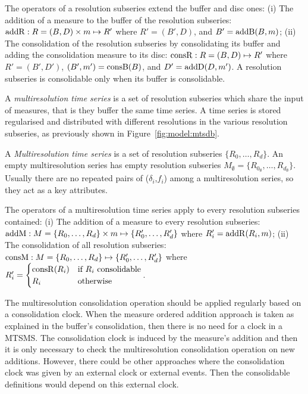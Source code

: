 The operators of a resolution subseries extend the buffer and disc
ones: (i) The addition of a measure to the buffer of the resolution
subseries: $\operatorname{addR} : R=(B,D) \times m \mapsto R'$ where $R'= (B',D)$,
and $B'= \operatorname{addB}(B,m)$; (ii) The consolidation of the resolution
subseries by consolidating its buffer and adding the consolidation
measure to its disc: $\operatorname{consR} : R=(B,D) \mapsto R'$ where $R'=
(B',D')$, $(B',m') = \operatorname{consB}(B)$, and $D'= \operatorname{addD}(D,m')$.  A resolution
subseries is consolidable only when its buffer is consolidable.




A \emph{multiresolution time series} is a set of resolution subseries
which share the input of measures, that is they buffer the same time
series. A time series is stored regularised and distributed with
different resolutions in the various resolution subseries, as
previously shown in Figure~\ref{fig:model:mtsdb}.
\begin{definition}%
  A \emph{Mul\-ti\-re\-solution time series} is a set of resolution
  subseries $\{R_0, \dots, R_d\}$.  An empty multiresolution series
  has empty resolution subseries $M_{\emptyset}=\{R_{0_\emptyset},
  \dots, R_{d_\emptyset}\}$. Usually there are no repeated pairs of
  ($\delta_i$,$f_i$) among a multiresolution series, so they act as a
  key attributes.
\end{definition}

The operators of a multiresolution time series apply to every
resolution subseries contained: (i) The addition of a measure to every
resolution subseries: $\operatorname{addM} : M=\{R_0, \dots, R_d\} \times m \mapsto
\{R'_0, \dots, R'_d\}$ where $R'_i=\operatorname{addR}(R_i,m)$; (ii) The
consolidation of all resolution subseries: $\operatorname{consM} : M=\{R_0, \dots,
R_d\} \mapsto \{R'_0, \dots, R'_d\}$ where %
$ 
R'_i = \begin{cases}
  \operatorname{consR}(R_i) & \text{if } R_i \text{ consolidable} \\
  R_i                       & \text{otherwise}
\end{cases}
$.


The multiresolution consolidation operation should be applied
regularly based on a consolidation clock. When the measure ordered
addition approach is taken as explained in the buffer's consolidation,
then there is no need for a clock in a MTSMS. The consolidation clock
is induced by the measure's addition and then it is only necessary to
check the multiresolution consolidation operation on new
additions. However, there could be other approaches where the
consolidation clock was given by an external clock or external
events. Then the consolidable definitions would depend on this
external clock.



